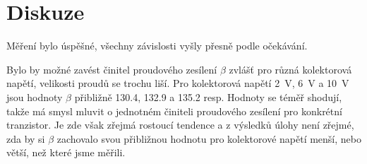\section*{Diskuze}
Měření bylo úspěšné, všechny závislosti vyšly přesně podle očekávání.

Bylo by možné zavést činitel proudového zesílení $\beta$ zvlášť pro různá kolektorová napětí, velikosti proudů se trochu liší.
Pro kolektorová napětí \SI{2}{\volt}, \SI{6}{\volt} a \SI{10}{\volt} jsou hodnoty $\beta$ přibližně \num{130.4}, \num{132.9} a \num{135.2} resp.
Hodnoty se téměř shodují, takže má smysl mluvit o jednotném činiteli proudového zesílení pro konkrétní tranzistor.
Je zde však zřejmá rostoucí tendence a z výsledků úlohy není zřejmé, zda by si $\beta$ zachovalo svou přibližnou hodnotu pro kolektorové napětí menší, nebo větší, než které jsme měřili.
